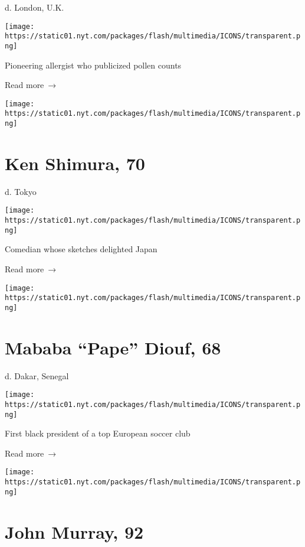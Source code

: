 d. London, U.K.

\texttt{[image: https://static01.nyt.com/packages/flash/multimedia/ICONS/transparent.png]}

Pioneering allergist who publicized pollen counts

 Read more~→

\href{https://www.nytimes.com/2020/04/02/obituaries/ken-shimura-dead-coronavirus.html}{}

\texttt{[image: https://static01.nyt.com/packages/flash/multimedia/ICONS/transparent.png]}

\hypertarget{ken-shimura-70}{%
\section{Ken Shimura, 70}\label{ken-shimura-70}}

d. Tokyo

\texttt{[image: https://static01.nyt.com/packages/flash/multimedia/ICONS/transparent.png]}

Comedian whose sketches delighted Japan

 Read more~→

\href{https://www.nytimes.com/2020/04/02/obituaries/mababa-pape-diouf-dead-coronavirus.html}{}

\texttt{[image: https://static01.nyt.com/packages/flash/multimedia/ICONS/transparent.png]}

\hypertarget{mababa-pape-diouf-68}{%
\section{Mababa ``Pape'' Diouf, 68}\label{mababa-pape-diouf-68}}

d. Dakar, Senegal

\texttt{[image: https://static01.nyt.com/packages/flash/multimedia/ICONS/transparent.png]}

First black president of a top European soccer club

 Read more~→

\href{https://www.nytimes.com/2020/04/02/science/john-murray-dead-coronavirus.html}{}

\texttt{[image: https://static01.nyt.com/packages/flash/multimedia/ICONS/transparent.png]}

\hypertarget{john-murray-92}{%
\section{John Murray, 92}\label{john-murray-92}}

